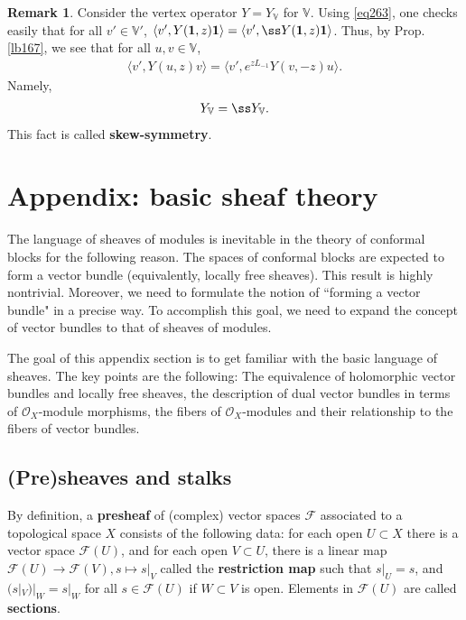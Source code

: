 \documentclass[12pt,a4paper,notitlepage]{article}
\theoremstyle{definition}
\newtheorem{rem}[df]{Remark}
\theoremstyle{plain}
\newcommand{\id}{\mathbf{1}}
\newcommand{\bk}[1]{\langle {#1}\rangle}
\newcommand{\scr}{\mathscr}
\newcommand{\Vbb}{\mathbb V}
\numberwithin{equation}{section}
\begin{document}
\begin{rem}
Consider the vertex operator $Y=Y_\Vbb$ for $\Vbb$. Using \eqref{eq263}, one checks easily that for all $v'\in\Vbb'$, $\bk{v',Y(\id,z)\id}=\bk{v',\ss Y(\id,z)\id}$. Thus, by Prop. \ref{lb167}, we see that for all $u,v\in\Vbb$,
\begin{align}
\bk{v',Y(u,z)v}=\bk{v',e^{zL_{-1}}Y(v,-z)u}.
\end{align}
Namely,
\begin{align}
Y_\Vbb=\ss Y_\Vbb.
\end{align}
This fact is called \textbf{skew-symmetry}.
\end{rem}



\appendix

\section{Appendix: basic sheaf theory}

The language of sheaves of modules is inevitable in the theory of conformal blocks for the following reason. The spaces of conformal blocks are expected to form a vector bundle (equivalently, locally free sheaves). This result is highly nontrivial. Moreover, we need to formulate the notion of ``forming a vector bundle" in a precise way. To accomplish this goal, we need to expand the concept of vector bundles to that of sheaves of modules.



The goal of this appendix section is to get familiar with the basic language of sheaves. The key points are the following: The equivalence of holomorphic vector bundles and locally free sheaves, the description of dual vector bundles in terms of $\scr O_X$-module morphisms, the fibers of $\scr O_X$-modules and their relationship to the fibers of vector bundles.



\subsection{(Pre)sheaves and stalks}

By definition, a \textbf{presheaf} of (complex) vector spaces $\scr F$ associated to a topological space $X$ consists of the following data: for each open $U\subset X$ there is a vector space $\scr F(U)$, and for each open $V\subset U$, there is a linear map $\scr F(U)\rightarrow\scr F(V),s\mapsto s|_V$ called the \textbf{restriction map} such that $s|_U=s$, and $(s|_V)|_W=s|_W$ for all $s\in\scr F(U)$ if $W\subset V$ is open. Elements in $\scr F(U)$ are called \textbf{sections}.
\end{document}
